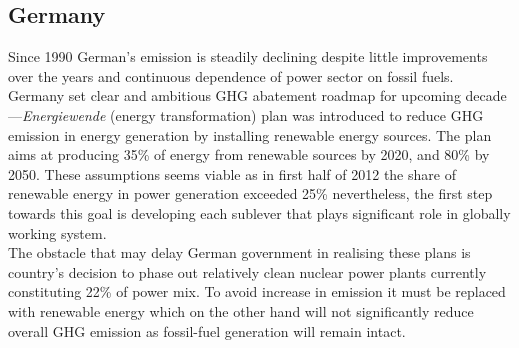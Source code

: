 \documentclass[11pt, twocolumn]{article}
\begin{document}
\subsection{Germany}
Since 1990 German's emission is steadily declining despite little improvements over the years and continuous dependence of power sector on fossil fuels.\\
Germany set clear and ambitious GHG abatement roadmap for upcoming decade---\emph{Energiewende} (energy transformation) plan was introduced to reduce GHG emission in energy generation by installing renewable energy sources. The plan aims at producing 35\% of energy from renewable sources by 2020, and 80\% by 2050. These assumptions seems viable as in first half of 2012 the share of renewable energy in power generation exceeded 25\% nevertheless, the first step towards this goal is developing each sublever that plays significant role in globally working system.\\
The obstacle that may delay German government in realising these plans is country's decision to phase out relatively clean nuclear power plants currently constituting 22\% of power mix. To avoid increase in emission it must be replaced with renewable energy which on the other hand will not significantly reduce overall GHG emission as fossil-fuel generation will remain intact.\\
\end{document}
